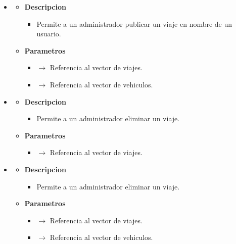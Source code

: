 \begin{itemize}
\begin{itemize}
\begin{itemize}
		\end{itemize}
	\end{itemize}
    \item {}
    \begin{itemize}
        \item \textbf{Descripcion}
        \begin{itemize}
			\item Permite a un administrador publicar un viaje en nombre de un usuario.
		\end{itemize}
		\item \textbf{Parametros}
		\begin{itemize}
			\item {}  $\rightarrow$ Referencia al vector de viajes.
            \item {} $\rightarrow$ Referencia al vector de vehiculos.
		\end{itemize}
	\end{itemize}
    \item {}
    \begin{itemize}
        \item \textbf{Descripcion}
        \begin{itemize}
			\item  Permite a un administrador eliminar un viaje.
		\end{itemize}
		\item \textbf{Parametros}
		\begin{itemize}
			\item {}  $\rightarrow$ Referencia al vector de viajes.
		\end{itemize}
	\end{itemize}
    \item {}
    \begin{itemize}
        \item \textbf{Descripcion}
        \begin{itemize}
			\item Permite a un administrador eliminar un viaje.
		\end{itemize}
		\item \textbf{Parametros}
		\begin{itemize}
			\item {}  $\rightarrow$ Referencia al vector de viajes.
            \item {} $\rightarrow$ Referencia al vector de vehiculos.

\end{itemize}
\end{itemize}
\end{itemize}
